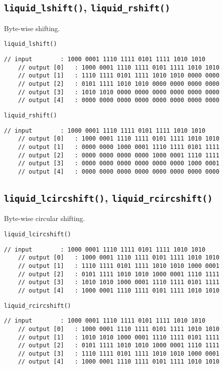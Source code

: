 \subsection{{\tt liquid\_lshift()},
            {\tt liquid\_rshift()}}
\label{module:utility:shift}
Byte-wise shifting.

{\tt liquid\_lshift()}
\begin{Verbatim}[fontsize=\small]
    // input        : 1000 0001 1110 1111 0101 1111 1010 1010
    // output [0]   : 1000 0001 1110 1111 0101 1111 1010 1010
    // output [1]   : 1110 1111 0101 1111 1010 1010 0000 0000
    // output [2]   : 0101 1111 1010 1010 0000 0000 0000 0000
    // output [3]   : 1010 1010 0000 0000 0000 0000 0000 0000
    // output [4]   : 0000 0000 0000 0000 0000 0000 0000 0000
\end{Verbatim}


{\tt liquid\_rshift()}
\begin{Verbatim}[fontsize=\small]
    // input        : 1000 0001 1110 1111 0101 1111 1010 1010
    // output [0]   : 1000 0001 1110 1111 0101 1111 1010 1010
    // output [1]   : 0000 0000 1000 0001 1110 1111 0101 1111
    // output [2]   : 0000 0000 0000 0000 1000 0001 1110 1111
    // output [3]   : 0000 0000 0000 0000 0000 0000 1000 0001
    // output [4]   : 0000 0000 0000 0000 0000 0000 0000 0000
\end{Verbatim}

\subsection{{\tt liquid\_lcircshift()},
            {\tt liquid\_rcircshift()}}
\label{module:utility:circshift}
Byte-wise circular shifting.

{\tt liquid\_lcircshift()}
\begin{Verbatim}[fontsize=\small]
    // input        : 1000 0001 1110 1111 0101 1111 1010 1010
    // output [0]   : 1000 0001 1110 1111 0101 1111 1010 1010
    // output [1]   : 1110 1111 0101 1111 1010 1010 1000 0001
    // output [2]   : 0101 1111 1010 1010 1000 0001 1110 1111
    // output [3]   : 1010 1010 1000 0001 1110 1111 0101 1111
    // output [4]   : 1000 0001 1110 1111 0101 1111 1010 1010
\end{Verbatim}

{\tt liquid\_rcircshift()}
\begin{Verbatim}[fontsize=\small]
    // input        : 1000 0001 1110 1111 0101 1111 1010 1010
    // output [0]   : 1000 0001 1110 1111 0101 1111 1010 1010
    // output [1]   : 1010 1010 1000 0001 1110 1111 0101 1111
    // output [2]   : 0101 1111 1010 1010 1000 0001 1110 1111
    // output [3]   : 1110 1111 0101 1111 1010 1010 1000 0001
    // output [4]   : 1000 0001 1110 1111 0101 1111 1010 1010
\end{Verbatim}

